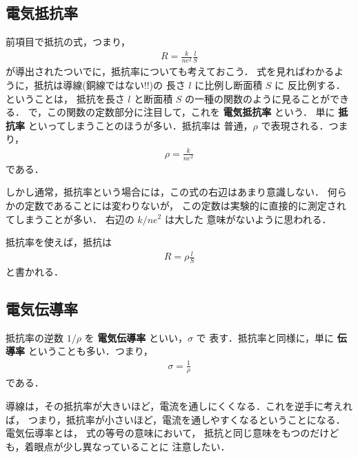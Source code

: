         \subsection{電気抵抗率}\label{subsub:teikou_ritu}
            前項目で抵抗の式，つまり，
                \begin{align}
                    R=\frac{k}{ne^{2}}\frac{l}{S}
                \end{align}
            が導出されたついでに，抵抗率についても考えておこう．
            式を見ればわかるように，抵抗は導線(銅線ではない!!)の
            長さ $l$ に比例し断面積 $S$ に
            反比例する．ということは，
            抵抗を長さ $l$ と断面積 $S$ の一種の関数のように見ることができる．
            で，この関数の定数部分に注目して，これを \textbf{電気抵抗率} という．
            単に \textbf{抵抗率} といってしまうことのほうが多い．抵抗率は
            普通，$\rho$ で表現される．つまり，
                \begin{align}
                    \rho=\frac{k}{ne^{2}}
                \end{align}
            である．

            しかし通常，抵抗率という場合には，この式の右辺はあまり意識しない．
            何らかの定数であることには変わりないが，
            この定数は実験的に直接的に測定されてしまうことが多い．
            右辺の $k/ne^{2}$ は大した
            意味がないように思われる．

            抵抗率を使えば，抵抗は
                \begin{align}
                    R=\rho\frac{l}{S}
                \end{align}
            と書かれる．

            \subsection{電気伝導率}
            抵抗率の逆数 $1/\rho$ を \textbf{電気伝導率} といい，$\sigma$ で
            表す．抵抗率と同様に，単に \textbf{伝導率} ということも多い．つまり，
                \begin{align}
                    \sigma=\frac{1}{\rho}
                \end{align}
            である．

            導線は，その抵抗率が大きいほど，電流を通しにくくなる．これを逆手に考えれば，
            つまり，抵抗率が小さいほど，電流を通しやすくなるということになる．電気伝導率とは，
            式の等号の意味において，
            抵抗と同じ意味をもつのだけども，着眼点が少し異なっていることに
            注意したい．

